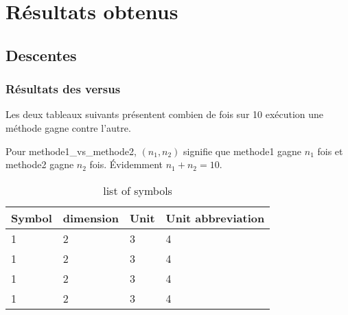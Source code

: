\section{Résultats obtenus}

\subsection{Descentes}
\subsubsection{Résultats des versus}
Les deux tableaux suivants présentent combien de fois sur 10 exécution une méthode gagne contre l'autre. 

Pour methode1\_vs\_methode2, $(n_1,n_2)$ signifie que methode1 gagne $n_1$ fois et methode2 gagne $n_2$ fois. Évidemment $n_1+n_2=10$.
\iffalse
\begin{table}[ht]
	\centering
	\caption{list of symbols}
	\begin{tabular}[t]
		{m{}m{}m{}m{}}
		\toprule
		\textbf{Symbol}&\textbf{dimension}&\textbf{Unit}&\textbf{Unit abbreviation}\\
		\midrule
		1&2&3&4\\
		1&2&3&4\\
		1&2&3&4\\
		1&2&3&4\\
		\bottomrule
	\end{tabular}

\end{table}


